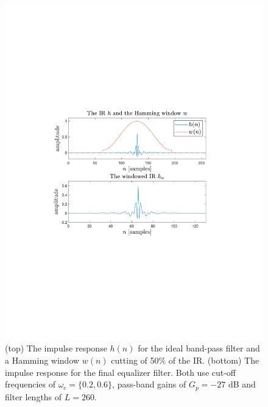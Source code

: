 \documentclass[journal]{IEEEtran}
\begin{document}
\begin{figure}
    \centering
    \includegraphics[width=\columnwidth]{assignment_02/plots/equalizer_ir.pdf}
    \caption{(top) The impulse response $h(n)$ for the ideal band-pass filter and a Hamming window $w(n)$ cutting of 50\% of the IR. (bottom) The impulse response for the final equalizer filter. Both use cut-off frequencies of $\omega_c=\{0.2,0.6\}$, pass-band gains of $G_p=-27$ dB and filter lengths of $L=260$.}
    \label{fig:eq_ir}
\end{figure}
\end{document}
